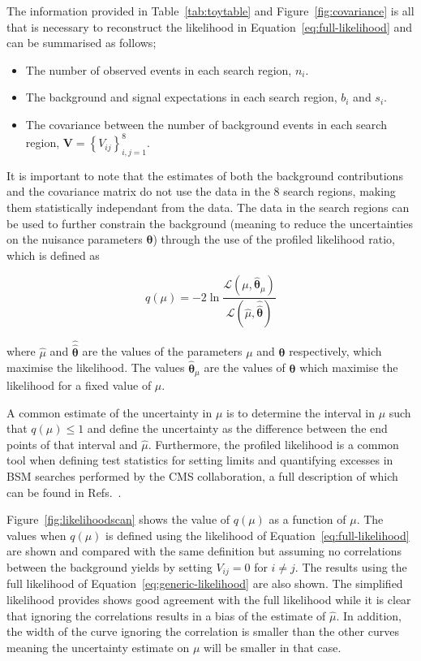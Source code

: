 The information provided in Table~\ref{tab:toytable} and Figure~\ref{fig:covariance} is all that is necessary to reconstruct the likelihood in Equation~\ref{eq:full-likelihood} and 
can be summarised as follows; 

\begin{itemize}
\item {The number of observed events in each search region, $n_{i}$.}
\item {The background and signal expectations in each search region, $b_{i}$ and $s_{i}$.}
\item {The covariance between the number of background events in each search region, $\mathrm{\mathbf{V}}=\left\{V_{ij}\right\}_{i,j=1}^{8}$. }
\end{itemize}

It is important to note that the estimates of both the background contributions and the 
covariance matrix do not use the data in the 8 search regions, making them statistically independant from the data. The data in the search regions 
can be used to further constrain the background (meaning to reduce the uncertainties on the nuisance parameters $\boldsymbol{\theta}$) through the use 
of the profiled likelihood ratio, which is defined as 

\begin{equation}
q(\mu) = -2\ln \dfrac {\mathcal{L}(\mu,\hat{\boldsymbol{\theta}}_{\mu})} {\mathcal{L}(\hat{\mu},\hat{\hat{\boldsymbol{\theta}}})}
\label{eq:llr}
\end{equation}

where $\hat{\mu}$ and $\hat{\hat{\boldsymbol{\theta}}}$ are the values of the parameters $\mu$ and $\boldsymbol{\theta}$ respectively, 
which maximise the likelihood. The values $\hat{\boldsymbol{\theta}}_{\mu}$ are the values of $\boldsymbol{\theta}$ which maximise the 
likelihood for a fixed value of $\mu$. 

A common estimate of the uncertainty in $\mu$ is to determine the interval in $\mu$ such that $q(\mu)\leq1$ and define the uncertainty as the difference between 
the end points of that interval and $\hat{\mu}$. Furthermore, the profiled likelihood is a common tool when defining test statistics for setting limits and quantifying excesses 
in BSM searches performed by the CMS collaboration, a full description of which can be found in Refs.~\cite{Chatrchyan:2012tx}.

Figure~\ref{fig:likelihoodscan} shows the value of $q(\mu)$ as a function of $\mu$. The values when $q(\mu)$ 
is defined using the likelihood of Equation~\ref{eq:full-likelihood} are shown and compared with the same definition but assuming no correlations between the 
background yields by setting $V_{ij}=0$ for $i\neq j$. The results using the full likelihood of Equation~\ref{eq:generic-likelihood} are also shown. The simplified 
likelihood provides shows good agreement with the full likelihood while it is clear that ignoring the correlations results in a bias of the estimate of $\hat{\mu}$. In 
addition, the width of the curve ignoring the correlation is smaller than the other curves meaning the uncertainty estimate on $\mu$ will be smaller in that case.  


